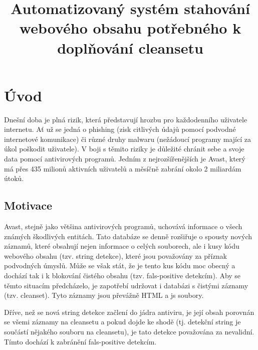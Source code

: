 \documentclass[thesis=M,czech,hidelinks]{FITthesis}[2013/05/06]
\title{Automatizovaný systém stahování webového obsahu potřebného k doplňování cleansetu}
\begin{document}





\chapter{Úvod}
Dnešní doba je plná rizik, která představují hrozbu pro každodenního uživatele internetu. Ať už se jedná o phishing (zisk citlivých údajů pomocí podvodné internetové komunikace) či různé druhy malwaru (nežádoucí programy mající za úkol poškodit uživatele). V boji s těmito riziky je důležité chránit sebe a svoje data pomocí antivirových programů. Jedním z nejrozšířenějších je Avast, který má přes 435 milionů aktivních uživatelů a měsíčně zabrání okolo 2 miliardám útoků\cite{avast_flier}.

\section{Motivace}
Avast, stejně jako většina antivirových programů, uchovává informace o všech známých škodlivých entitách. Tato databáze se denně rozšiřuje o spousty nových záznamů, které obsahují nejen informace o celých souborech, ale i kusy kódu webového obsahu (tzv. string detekce), které jsou považovány za příznak podvodných úmyslů. Může se však stát, že je tento kus kódu moc obecný a dochází tak i k blokování čistého obsahu (tzv. fals-positive detekcím). Aby se těmto situacím předcházelo, je zapotřebí udržovat i databázi s čistými záznamy (tzv. cleanset). Tyto záznamy jsou převážně HTML a js soubory.

Dříve, než se nová string detekce začlení do jádra antiviru, je její obsah porovnán se všemi záznamy na cleansetu a pokud dojde ke shodě (tj. detekční string je součástí nějakého souboru na cleansetu), je tato detekce považována za nevalidní. Tímto dochází k zabránění fals-positive detekcím. 
\end{document}
